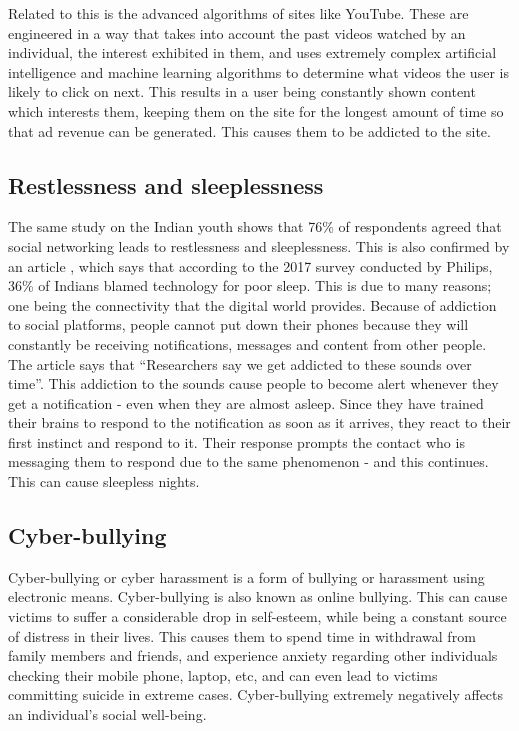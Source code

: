 \documentclass[a4paper, 11pt]{article}
\begin{document}
Related to this is the advanced algorithms of sites like YouTube. These are engineered in a way that takes into account the past videos watched by an individual, the interest exhibited in them, and uses extremely complex artificial intelligence and machine learning algorithms to determine  what videos the user is likely to click on next. This results in a user being constantly shown content which interests them, keeping them on the site for the longest amount of time so that ad revenue can be generated. This causes them to be addicted to the site.

\subsection{Restlessness and sleeplessness}
\label{national-restlessness}

The same study on the Indian youth shows that 76\% of respondents agreed that social networking leads to restlessness and sleeplessness. This is also confirmed by an article \cite{your-gadgets-are-robbing-you-of-your-sleep} , which says that according to the 2017 survey conducted by Philips, 36\% of Indians blamed technology for poor sleep. This is due to many reasons; one being the connectivity that the digital world provides. Because of addiction to social platforms, people cannot put down their phones because they will constantly be receiving notifications, messages and content from other people. The article says that “Researchers say we get addicted to these sounds over time”. This addiction to the sounds cause people to become alert whenever they get a notification - even when they are almost asleep. Since they have trained their brains to respond to the notification as soon as it arrives, they react to their first instinct and respond to it. Their response prompts the contact who is messaging them to respond due to the same phenomenon - and this continues. This can cause sleepless nights.

\subsection{Cyber-bullying}
Cyber-bullying or cyber harassment is a form of bullying or harassment using electronic means. Cyber-bullying is also known as online bullying. This can cause victims to suffer a considerable drop in self-esteem, while being a constant source of distress in their lives. This causes them to spend time in withdrawal from family members and friends, and experience anxiety regarding other individuals checking their mobile phone, laptop, etc, and can even lead to victims committing suicide in extreme cases. Cyber-bullying extremely negatively affects an individual’s social well-being.
\end{document}
